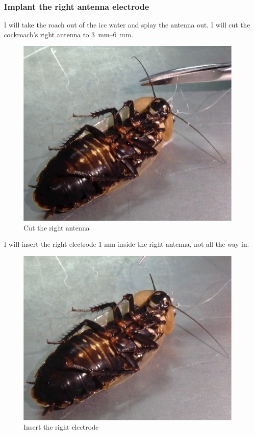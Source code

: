 \subsubsection{Implant the right antenna electrode}
I will take the roach out of the ice water and splay the antenna out. I will cut the cockroach's right antenna to \SIrange{3}{6}{\milli\meter}. 
{\begin{figure}[ht!]
\centering
\includegraphics[scale=0.3]{Surgery Photos/cut.jpg}
\caption{Cut the right antenna}
\label{fig:cut}
\end{figure}}
I will insert the right electrode 1 mm inside the right antenna, not all the way in. 
{\begin{figure}[ht!]
\centering
\includegraphics[scale=0.3]{Surgery Photos/relectrode1.jpg}
\caption{Insert the right electrode}
\label{fig:relectrode1}
\end{figure}}
